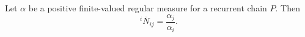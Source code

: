 Let $\alpha$ be a positive finite-valued regular measure for a recurrent chain $P$. Then
$${}^i \bar{N}_{ij} = \frac{\alpha_j}{\alpha_i}.$$
